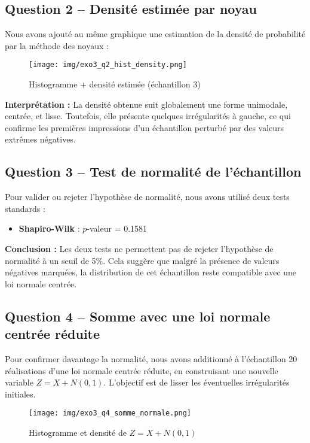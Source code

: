 \documentclass[a4paper,11pt]{article}
\begin{document}
\subsection*{Question 2 – Densité estimée par noyau}
Nous avons ajouté au même graphique une estimation de la densité de probabilité par la méthode des noyaux :

\begin{figure}[H]
    \centering
    \texttt{[image: img/exo3\_q2\_hist\_density.png]}
    \caption{Histogramme + densité estimée (échantillon 3)}
\end{figure}

\textbf{Interprétation :} La densité obtenue suit globalement une forme unimodale, centrée, et lisse. Toutefois, elle présente quelques irrégularités à gauche, ce qui confirme les premières impressions d’un échantillon perturbé par des valeurs extrêmes négatives.

\subsection*{Question 3 – Test de normalité de l’échantillon}
Pour valider ou rejeter l’hypothèse de normalité, nous avons utilisé deux tests standards :

\begin{itemize}
    \item \textbf{Shapiro-Wilk} : $p$-valeur = 0.1581
\end{itemize}

\textbf{Conclusion :} Les deux tests ne permettent pas de rejeter l’hypothèse de normalité à un seuil de 5\%. Cela suggère que malgré la présence de valeurs négatives marquées, la distribution de cet échantillon reste compatible avec une loi normale centrée.

\subsection*{Question 4 – Somme avec une loi normale centrée réduite}
Pour confirmer davantage la normalité, nous avons additionné à l’échantillon 20 réalisations d’une loi normale centrée réduite, en construisant une nouvelle variable $Z = X + N(0,1)$. L’objectif est de lisser les éventuelles irrégularités initiales.

\begin{figure}[H]
    \centering
    \texttt{[image: img/exo3\_q4\_somme\_normale.png]}
    \caption{Histogramme et densité de $Z = X + N(0,1)$}
\end{figure}
\end{document}
